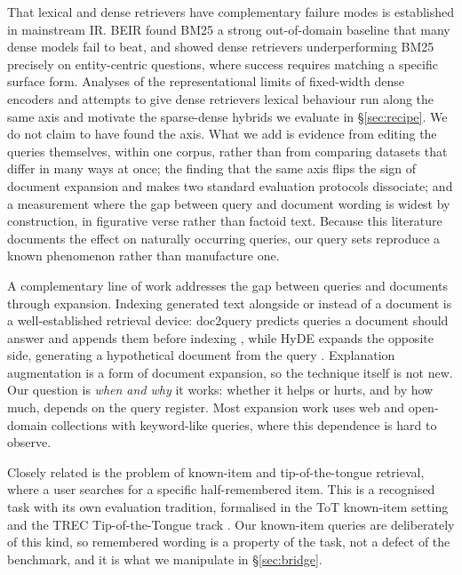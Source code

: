 \documentclass[11pt]{article}
\begin{document}
That lexical and dense retrievers have complementary failure modes is established in mainstream IR. BEIR \citep{thakur2021beir} found BM25 a strong out-of-domain baseline that many dense models fail to beat, and \citet{sciavolino-etal-2021-simple} showed dense retrievers underperforming BM25 precisely on entity-centric questions, where success requires matching a specific surface form. Analyses of the representational limits of fixed-width dense encoders \citep{luan-etal-2021-sparse} and attempts to give dense retrievers lexical behaviour \citep{chen2021spar} run along the same axis and motivate the sparse-dense hybrids we evaluate in \S\ref{sec:recipe}. We do not claim to have found the axis. What we add is evidence from editing the queries themselves, within one corpus, rather than from comparing datasets that differ in many ways at once; the finding that the same axis flips the sign of document expansion and makes two standard evaluation protocols dissociate; and a measurement where the gap between query and document wording is widest by construction, in figurative verse rather than factoid text. Because this literature documents the effect on naturally occurring queries, our query sets reproduce a known phenomenon rather than manufacture one.

A complementary line of work addresses the gap between queries and documents through expansion. Indexing generated text alongside or instead of a document is a well-established retrieval device: doc2query predicts queries a document should answer and appends them before indexing \citep{nogueira2019doc2query}, while HyDE expands the opposite side, generating a hypothetical document from the query \citep{gao2022hyde}. Explanation augmentation is a form of document expansion, so the technique itself is not new. Our question is \emph{when and why} it works: whether it helps or hurts, and by how much, depends on the query register. Most expansion work uses web and open-domain collections with keyword-like queries, where this dependence is hard to observe.

Closely related is the problem of known-item and tip-of-the-tongue retrieval, where a user searches for a specific half-remembered item. This is a recognised task with its own evaluation tradition, formalised in the ToT known-item setting \citep{arguello2021tot} and the TREC Tip-of-the-Tongue track \citep{arguello2023trectot}. Our known-item queries are deliberately of this kind, so remembered wording is a property of the task, not a defect of the benchmark, and it is what we manipulate in \S\ref{sec:bridge}.
\end{document}
